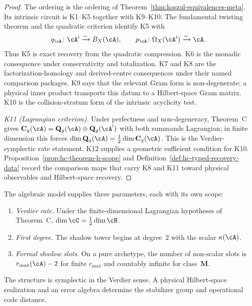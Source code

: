 \begin{proof}
The ordering is the ordering of
Theorem~\ref{thm:koszul-equivalences-meta}.  Its intrinsic circuit is
K1--K5 together with K9--K10.  The fundamental twisting theorem
\cite[Theorem~2.3.2]{LodayVallette12} and the quadratic criterion
\cite[Theorem~3.4.6]{LodayVallette12} identify K5 with
\[
q_\cA\colon\cA^{\mathrm i}\xrightarrow{\sim}B_X(\cA),
\qquad
p_\cA\colon\Omega_X(\cA^{\mathrm i})\xrightarrow{\sim}\cA.
\]
Thus K5 is exact recovery from the quadratic compression.  K6 is the
monadic consequence under conservativity and totalization.  K7 and K8
are the factorization-homology and derived-centre consequences under
their named comparison packages.  K9 says that the relevant Gram form
is non-degenerate; a physical inner product transports this datum to a
Hilbert-space Gram matrix.  K10 is the collision-stratum form of the
intrinsic acyclicity test.

\emph{K11 (Lagrangian criterion).}
Under perfectness and non-degeneracy, Theorem~C gives
$\mathbf C_g(\cA)=\mathbf Q_g(\cA)\oplus\mathbf Q_g(\cA^!)$ with
both summands Lagrangian; in finite dimension this forces
$\dim\mathbf Q_g(\cA)=\frac12\dim\mathbf C_g(\cA)$.  This is the
Verdier-symplectic rate statement.  K12 supplies a geometric sufficient
condition for K10.  Proposition~\ref{prop:hc-theorem-h-scope} and
Definition~\ref{def:hc-typed-recovery-data} record the comparison maps
that carry K8 and K11 toward physical observables and Hilbert-space
recovery.
\end{proof}

\begin{remark}
\label{rem:hc-universal-parameters}
The algebraic model supplies three parameters, each with its own
scope:
\begin{enumerate}[label=\textup{(\roman*)}]
\item \emph{Verdier rate.}
 Under the finite-dimensional Lagrangian hypotheses of Theorem~C,
 $\dim \cC=\tfrac12\dim\cH$.
\item \emph{First degree.}
 The shadow tower begins at degree~$2$ with the scalar
 $\kappa(\cA)$.
\item \emph{Formal shadow slots.}
 On a pure archetype, the number of non-scalar slots is
 $r_{\max}(\cA)-2$ for finite $r_{\max}$ and countably infinite for
 class~$\mathbf M$.
\end{enumerate}
The structure is symplectic in the Verdier sense.  A physical
Hilbert-space realization and an error algebra determine the
stabilizer group and operational code distance.
\end{remark}

